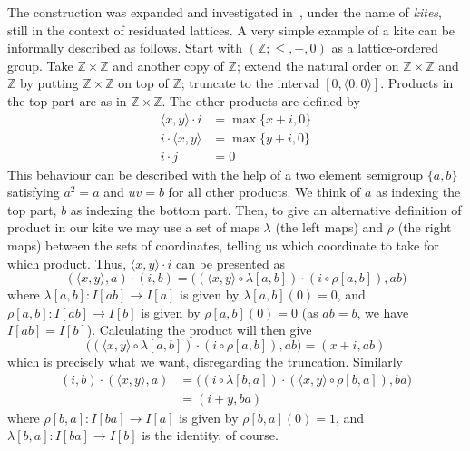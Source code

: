\documentclass{amsart}
\begin{document}
The construction was expanded and
investigated in~\cite{DK14}, under the name of \emph{kites}, still in the
context of residuated lattices. A very simple example of a kite can be
informally described as follows. Start with $(\mathbb{Z}; \leq, +, 0)$ as a
lattice-ordered 
group. Take $\mathbb{Z}\times \mathbb{Z}$ and another copy of $\mathbb{Z}$;
extend the natural order on $\mathbb{Z}\times \mathbb{Z}$ and
$\mathbb{Z}$
by putting $\mathbb{Z}\times \mathbb{Z}$ on top of
$\mathbb{Z}$; truncate to the interval $[0, \langle 0,0\rangle]$. Products
in the top part are as in $\mathbb{Z}\times \mathbb{Z}$. The other products
are defined by
\begin{align*}
  \langle x,y\rangle\cdot i &= \max\{x+i,0\}\\
  i\cdot\langle x,y\rangle &=  \max\{y+i,0\}\\
  i\cdot j &= 0
\end{align*}
This behaviour can be described with the help of a two element semigroup
$\{a,b\}$ satisfying $a^2 = a$ and $uv = b$ for all other products. 
We think of $a$ as indexing the top part, $b$ as indexing the bottom part. 
Then, to give an alternative definition of product in our kite
we may use a set of maps $\lambda$ (the left maps) and
$\rho$ (the right maps) between the sets of coordinates, telling us which
coordinate to take for which product. Thus, 
$\langle x,y\rangle\cdot i$ can be presented as
$$
(\langle x,y\rangle, a)\cdot (i, b) =
\bigl((\langle x,y\rangle\circ \lambda[a,b])\cdot (i\circ \rho[a,b]), ab\bigr) 
$$
where $\lambda[a,b]\colon I[ab] \to I[a]$ is given by
$\lambda[a,b](0) = 0$, and $\rho[a,b]\colon I[ab] \to I[b]$ is given by
$\rho[a,b](0) = 0$ (as $ab = b$, we have $I[ab] = I[b]$). Calculating the
product will then give 
$$
\bigl((\langle x,y\rangle\circ \lambda[a,b])\cdot (i\circ \rho[a,b]), ab\bigr)
= (x + i, ab)
$$
which is precisely what we want, disregarding the truncation. Similarly
\begin{align*}
(i, b)\cdot (\langle x,y\rangle, a)
&= \bigl((i\circ \lambda[b,a])\cdot (\langle x,y\rangle\circ \rho[b,a]), ba\bigr)\\ 
&= (i + y, ba) 
\end{align*}  
where $\rho[b,a]\colon I[ba]\to I[a]$ is given by $\rho[b,a](0) = 1$,
and $\lambda[b,a]\colon I[ba]\to I[b]$ is the identity, of course.  
\end{document}
